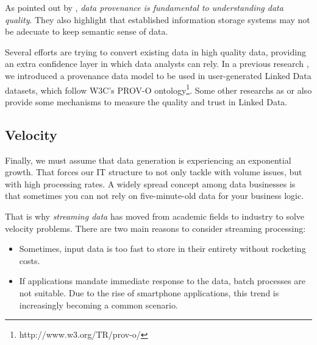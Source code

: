 As pointed out by \cite{buneman2013data}, \textit{data provenance is fundamental to understanding data quality}. They also highlight that established information storage systems may not be adecuate to keep semantic sense of data.

Several efforts are trying to convert existing data in high quality data, providing an extra confidence layer in which data analysts can rely. In a previous research \cite{emalditrust}, we introduced a provenance data model to be used in user-generated Linked Data datasets, which follow W3C's PROV-O ontology\footnote{http://www.w3.org/TR/prov-o/}. Some other researchs as \cite{hartig_using_2009} or \cite{bizer_quality_2009} also provide some mechanisms to measure the quality and trust in Linked Data.

\subsection{Velocity}

Finally, we must assume that data generation is experiencing an exponential growth. That forces our IT structure to not only tackle with volume issues, but with high processing rates. A widely spread concept among data businesses is that sometimes you can not rely on five-minute-old data for your business logic.

That is why \textit{streaming data} has moved from academic fields to industry to solve velocity problems. There are two main reasons to consider streaming processing:
\begin{itemize}
	\item Sometimes, input data is too fast to store in their entirety without rocketing costs.
	\item If applications mandate immediate response to the data, batch processes are not suitable. Due to the rise of smartphone applications, this trend is increasingly becoming a common scenario.
\end{itemize}
